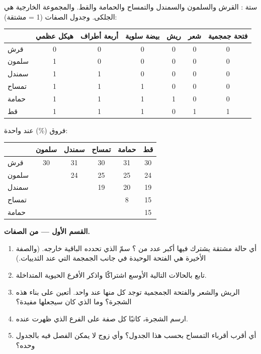 \begin{problem}
\label{pb:g12:phylogenetic-trees:1}
ستة : القرش والسلمون والسمندل والتمساح والحمامة والقط. والمجموعة
الخارجية هي الجلكى. وجدول الصفات (1 = مشتقة):

\begin{center}
\small
\begin{tabular}{lcccccc}
 & هيكل عظمي & أربعة أطراف & بيضة سلوية & ريش & شعر & فتحة جمجمية \\ \hline
قرش & 0 & 0 & 0 & 0 & 0 & 0 \\
سلمون & 1 & 0 & 0 & 0 & 0 & 0 \\
سمندل & 1 & 1 & 0 & 0 & 0 & 0 \\
تمساح & 1 & 1 & 1 & 0 & 0 & 0 \\
حمامة & 1 & 1 & 1 & 1 & 0 & 0 \\
قط & 1 & 1 & 1 & 0 & 1 & 1 \\
\end{tabular}
\end{center}

فروق  (\%) عند  واحدة:

\begin{center}
\begin{tabular}{lccccc}
 & سلمون & سمندل & تمساح & حمامة & قط \\ \hline
قرش & 30 & 31 & 30 & 31 & 30 \\
سلمون & & 24 & 25 & 25 & 24 \\
سمندل & & & 19 & 20 & 19 \\
تمساح & & & & 8 & 15 \\
حمامة & & & & & 15 \\
\end{tabular}
\end{center}

\medskip
\noindent\textbf{القسم الأول --- من الصفات.}
\begin{enumerate}
  \item أي حالة مشتقة يشترك فيها أكبر عدد من ؟ سمّ 
        الذي تحدده  الباقية خارجه. (والصفة الأخيرة هي الفتحة
        الوحيدة في جانب الجمجمة التي عند الثدييات.)
  \item تابع بالحالات التالية الأوسع اشتراكًا واذكر الأفرع الحيوية
        المتداخلة.
  \item الريش والشعر والفتحة الجمجمية توجد كل منها عند  واحد. أتعين
        على بناء هذه الشجرة؟ وما الذي كان سيجعلها مفيدة؟
  \item ارسم الشجرة، كاتبًا كل صفة على الفرع الذي ظهرت عنده.
  \item أي  أقرب أقرباء التمساح بحسب هذا الجدول؟ وأي زوج لا
        يمكن الفصل فيه بالجدول وحده؟
\end{enumerate}


\end{problem}
